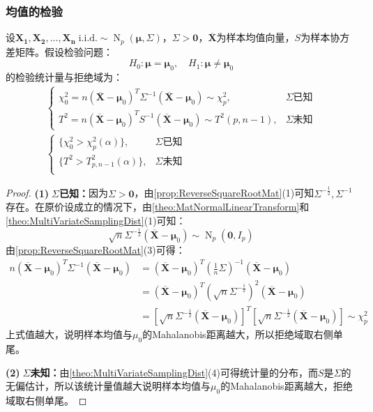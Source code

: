 \subsubsection{均值的检验}
\begin{theorem}
	设$\mathbf{X_1},\mathbf{X_2},\dots,\mathbf{X_n}\;\text{i.i.d.}\sim\operatorname{N}_p(\boldsymbol{\mu},\Sigma)$，$\Sigma>\mathbf{0}$，$\overline{\mathbf{X}}$为样本均值向量，$S$为样本协方差矩阵。假设检验问题：
	\begin{equation*}
		H_0:\boldsymbol{\mu}=\boldsymbol{\mu}_0,\quad H_1:\boldsymbol{\mu}\ne\boldsymbol{\mu}_0
	\end{equation*}
	的检验统计量与拒绝域为：
	\begin{gather*}
		\begin{cases}
			\chi_0^2=n(\overline{\mathbf{X}}-\boldsymbol{\mu}_0)^T\Sigma^{-1}(\overline{\mathbf{X}}-\boldsymbol{\mu}_0)\sim\chi_p^2,&\Sigma\text{已知} \\
			T^2=n(\overline{\mathbf{X}}-\boldsymbol{\mu}_0)^TS^{-1}(\overline{\mathbf{X}}-\boldsymbol{\mu}_0)\sim T^2(p,n-1),&\Sigma\text{未知}
		\end{cases} \\
		\begin{cases}
			\{\chi_0^2>\chi_p^2(\alpha)\},&\Sigma\text{已知} \\
			\{T^2>T^2_{p,n-1}(\alpha)\},&\Sigma\text{未知} \\
		\end{cases}
	\end{gather*}
\end{theorem}
\begin{proof}
	\textbf{(1)$\;\Sigma$已知：}因为$\Sigma>\mathbf{0}$，由\cref{prop:ReverseSquareRootMat}(1)可知$\Sigma^{-\frac{1}{2}},\Sigma^{-1}$存在。在原价设成立的情况下，由\cref{theo:MatNormalLinearTransform}和\cref{theo:MultiVariateSamplingDist}(1)可知：
	\begin{equation*}
		\sqrt{n}\Sigma^{-\frac{1}{2}}(\overline{\mathbf{X}}-\boldsymbol{\mu}_0)\sim\operatorname{N}_p(\mathbf{0},I_p)
	\end{equation*}
	由\cref{prop:ReverseSquareRootMat}(3)可得：
	\begin{align*}
		n(\overline{\mathbf{X}}-\boldsymbol{\mu}_0)^T\Sigma^{-1}(\overline{\mathbf{X}}-\boldsymbol{\mu}_0)
		&=(\overline{\mathbf{X}}-\boldsymbol{\mu}_0)^T\left(\frac{1}{n}\Sigma\right)^{-1}(\overline{\mathbf{X}}-\boldsymbol{\mu}_0) \\
		&=(\overline{\mathbf{X}}-\boldsymbol{\mu}_0)^T\left(\sqrt{n}\Sigma^{-\frac{1}{2}}\right)^{2}(\overline{\mathbf{X}}-\boldsymbol{\mu}_0) \\
		&=[\sqrt{n}\Sigma^{-\frac{1}{2}}(\overline{\mathbf{X}}-\boldsymbol{\mu}_0)]^T[\sqrt{n}\Sigma^{-\frac{1}{2}}(\overline{\mathbf{X}}-\boldsymbol{\mu}_0)]\sim\chi^2_p
	\end{align*}
	上式值越大，说明样本均值与$\mu_0$的Mahalanobis距离越大，所以拒绝域取右侧单尾。\par
	\textbf{(2)$\;\Sigma$未知：}由\cref{theo:MultiVariateSamplingDist}(4)可得统计量的分布，而$S$是$\Sigma$的无偏估计，所以该统计量值越大说明样本均值与$\mu_0$的Mahalanobis距离越大，拒绝域取右侧单尾。
\end{proof}
